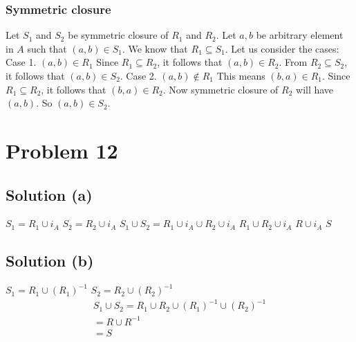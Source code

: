 \documentclass{article}
\begin{document}
\subsubsection{Symmetric closure}
Let $S_1$ and $S_2$ be symmetric closure of $R_1$ and $R_2$. Let $a,b$
be arbitrary element in $A$ such that $(a,b) \in S_1$. We know that
$R_1 \subseteq S_1$. Let us consider the cases:
Case 1. $(a,b) \in R_1$ Since $R_1 \subseteq R_2$, it follows that
$(a,b) \in R_2$. From $R_2 \subseteq S_2$, it follows that $(a,b) \in
S_2$.
Case 2. $(a,b) \notin R_1$ This means $(b,a) \in R_1$. Since $R_1
\subseteq R_2$, it follows that $(b,a) \in R_2$. Now symmetric closure
of $R_2$ will have $(a,b)$. So $(a,b) \in S_2$.

\section{Problem 12}
\subsection{Solution (a)}
$S_1 = R_1 \cup i_A$
$S_2 = R_2 \cup i_A$
$S_1 \cup S_2 = R_1 \cup i_A \cup R_2 \cup i_A$
$R_1 \cup R_2 \cup i_A$
$R \cup i_A$
$S$

\subsection{Solution (b)}
$S_1 = R_1 \cup (R_1)^{-1}$
$S_2 = R_2 \cup (R_2)^{-1}$
\begin{align*}
  S_1 \cup S_2 = R_1 \cup R_2 \cup (R_1)^{-1} \cup (R_2)^{-1} \\
  = R \cup R^{-1} \\
  = S
\end{align*}
\end{document}
